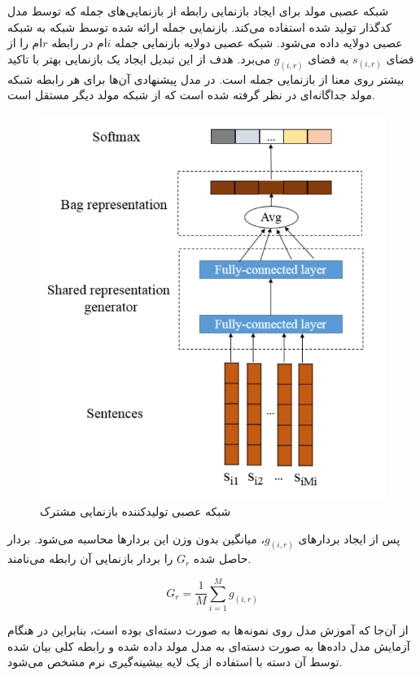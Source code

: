 شبکه عصبی مولد برای ایجاد بازنمایی رابطه از بازنمایی‌های جمله‌ که توسط مدل کدگذار  تولید شده استفاده می‌کند.
بازنمایی جمله ارائه شده توسط شبکه  به شبکه عصبی دولایه داده می‌شود. شبکه عصبی دولایه بازنمایی جمله $i$ام در رابطه
$r$ام را از فضای $s_{(i,r)}$ به فضای $g_{(i,r)}$ می‌برد. هدف از این تبدیل ایجاد یک بازنمایی بهتر با تاکید بیشتر روی معنا از بازنمایی
جمله است. در مدل پیشنهادی آن‌ها برای هر رابطه شبکه مولد جداگانه‌ای در نظر گرفته شده است که از شبکه مولد دیگر
مستقل است.

\begin{figure}[h]
    \centering
    \includegraphics[scale=0.4]{images/shared/shared_repre.png}
    \caption{شبکه عصبی تولید‌کننده بازنمایی مشترک}
    \label{shared_representation_generator_network}
\end{figure}

پس از ایجاد بردار‌های $g_{(i,r)}$، میانگین بدون وزن این بردار‌ها محاسبه می‌شود. بردار حاصل شده $G_{r}$
را بردار بازنمایی آن رابطه می‌نامند.

$$G_{r} = \frac{1}{M} \sum_{i=1}^{M} g_{(i,r)}$$

از آن‌جا که آموزش مدل روی نمونه‌ها به صورت دسته‌ای بوده است، بنابراین در هنگام آزمایش مدل داده‌ها به صورت
دسته‌ای به مدل مولد داده شده و رابطه کلی بیان شده توسط آن‌ دسته با استفاده از یک لایه بیشینه‌گیری نرم
مشخص می‌شود.

